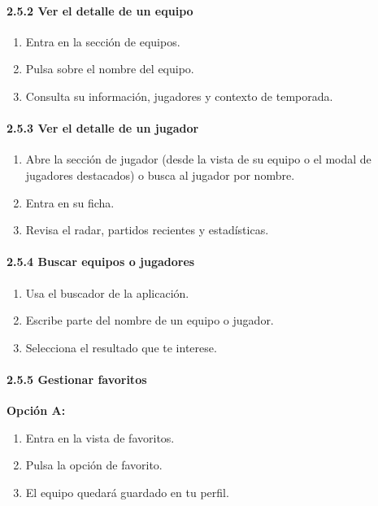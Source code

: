 \paragraph*{2.5.2 Ver el detalle de un equipo}

\begin{enumerate}
    \item Entra en la sección de equipos.
    \item Pulsa sobre el nombre del equipo.
    \item Consulta su información, jugadores y contexto de temporada.
\end{enumerate}

\paragraph*{2.5.3 Ver el detalle de un jugador}

\begin{enumerate}
    \item Abre la sección de jugador (desde la vista de su equipo o el modal de jugadores destacados) o busca al jugador por nombre.
    \item Entra en su ficha.
    \item Revisa el radar, partidos recientes y estadísticas.
\end{enumerate}

\paragraph*{2.5.4 Buscar equipos o jugadores}

\begin{enumerate}
    \item Usa el buscador de la aplicación.
    \item Escribe parte del nombre de un equipo o jugador.
    \item Selecciona el resultado que te interese.
\end{enumerate}

\paragraph*{2.5.5 Gestionar favoritos}

\textbf{Opción A:}
\begin{enumerate}
    \item Entra en la vista de favoritos.
    \item Pulsa la opción de favorito.
    \item El equipo quedará guardado en tu perfil.
\end{enumerate}

